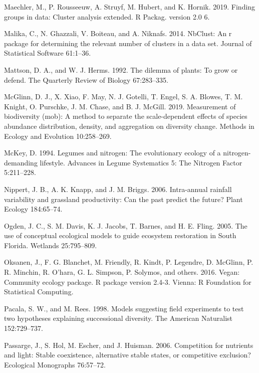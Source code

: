 \documentclass[twoside,12pt,final]{ucthesis-CA2012}
\newlength{\cslhangindent}
\newenvironment{cslreferences}%
  {\setlength{\parindent}{0pt}%
  \everypar{\setlength{\hangindent}{\cslhangindent}}\ignorespaces}%
  {\par}
\begin{document}
\begin{ucmainmatter}
\begin{cslreferences}
\leavevmode\hypertarget{ref-Maechler2019}{}%
Maechler, M., P. Rousseeuw, A. Struyf, M. Hubert, and K. Hornik. 2019. Finding groups in data: Cluster analysis extended. R Packag. version 2.0 6.

\leavevmode\hypertarget{ref-Charrad2014}{}%
Malika, C., N. Ghazzali, V. Boiteau, and A. Niknafs. 2014. NbClust: An r package for determining the relevant number of clusters in a data set. Journal of Statistical Software 61:1--36.

\leavevmode\hypertarget{ref-Mattson1992}{}%
Mattson, D. A., and W. J. Herms. 1992. The dilemma of plants: To grow or defend. The Quarterly Review of Biology 67:283--335.

\leavevmode\hypertarget{ref-mcglinn2019}{}%
McGlinn, D. J., X. Xiao, F. May, N. J. Gotelli, T. Engel, S. A. Blowes, T. M. Knight, O. Purschke, J. M. Chase, and B. J. McGill. 2019. Measurement of biodiversity (mob): A method to separate the scale-dependent effects of species abundance distribution, density, and aggregation on diversity change. Methods in Ecology and Evolution 10:258--269.

\leavevmode\hypertarget{ref-McKey1994}{}%
McKey, D. 1994. Legumes and nitrogen: The evolutionary ecology of a nitrogen-demanding lifestyle. Advances in Legume Systematics 5: The Nitrogen Factor 5:211--228.

\leavevmode\hypertarget{ref-Nippert2006}{}%
Nippert, J. B., A. K. Knapp, and J. M. Briggs. 2006. Intra-annual rainfall variability and grassland productivity: Can the past predict the future? Plant Ecology 184:65--74.

\leavevmode\hypertarget{ref-Ogden2005}{}%
Ogden, J. C., S. M. Davis, K. J. Jacobs, T. Barnes, and H. E. Fling. 2005. The use of conceptual ecological models to guide ecosystem restoration in South Florida. Wetlands 25:795--809.

\leavevmode\hypertarget{ref-Oksanen2016}{}%
Oksanen, J., F. G. Blanchet, M. Friendly, R. Kindt, P. Legendre, D. McGlinn, P. R. Minchin, R. O'hara, G. L. Simpson, P. Solymos, and others. 2016. Vegan: Community ecology package. R package version 2.4-3. Vienna: R Foundation for Statistical Computing.

\leavevmode\hypertarget{ref-Pacala1998}{}%
Pacala, S. W., and M. Rees. 1998. Models suggesting field experiments to test two hypotheses explaining successional diversity. The American Naturalist 152:729--737.

\leavevmode\hypertarget{ref-Passarge2006}{}%
Passarge, J., S. Hol, M. Escher, and J. Huisman. 2006. Competition for nutrients and light: Stable coexistence, alternative stable states, or competitive exclusion? Ecological Monographs 76:57--72.


\end{cslreferences}
\end{ucmainmatter}
\end{document}

